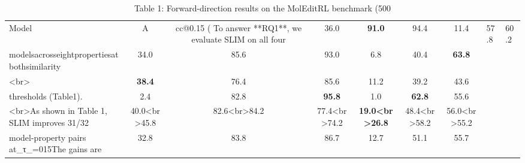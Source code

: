 \begin{table}[t]
\centering
\caption{Table 1: Forward-direction results on the MolEditRL benchmark (500}
\label{tab:2605.10831}
\begin{tabular}{lcccccc}
\toprule
Model & A & cc@0.15 (%
\midrule
To answer **RQ1**, we evaluate SLIM on all four & 36.0 & \textbf{91.0} & 94.4 & 11.4 & 57.8 & 60.2 \\
modelsacrosseightpropertiesatbothsimilarity & 34.0 & 85.6 & 93.0 & 6.8 & 40.4 & \textbf{63.8} \\
<br> & \textbf{38.4} & 76.4 & 85.6 & 11.2 & 39.2 & 43.6 \\
thresholds (Table1). & 2.4 & 82.8 & \textbf{95.8} & 1.0 & \textbf{62.8} & 55.6 \\
<br>As shown in Table 1, SLIM improves 31/32 & 40.0<br>45.8 & 82.6<br>84.2 & 77.4<br>74.2 & \textbf{19.0<br>26.8} & 48.4<br>58.2 & 56.0<br>55.2 \\
model-property pairs at_τ_=015The gains are & 32.8 & 83.8 & 86.7 & 12.7 & 51.1 & 55.7 \\
\bottomrule
\end{tabular}
\end{table}
